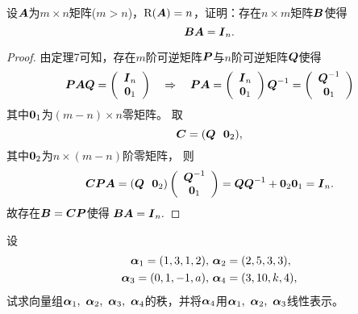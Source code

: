 \begin{frame}
\begin{li}
  设$\A$为$m\times n$矩阵($m>n$)，$\rank(\A)=n$，证明：存在$n\times m$矩阵$\B$使得
  $$
  \B\A=\II_n.
  $$
\end{li}\pause 
\begin{proof}
由定理7可知，存在$m$阶可逆矩阵$\PP$与$n$阶可逆矩阵$\QQ$使得
$$
\PP\A\QQ=\left(
  \begin{array}{c}
    \II_n\\
    \zero_1
  \end{array}
\right)     
~~~\Rightarrow~~~
\PP\A=\left(
  \begin{array}{c}
    \II_n\\
    \zero_1
  \end{array}
\right)\QQ^{-1}=\left(
  \begin{array}{c}
    \QQ^{-1}\\
    \zero_1
  \end{array}
\right)
$$
其中$\zero_1$为$(m-n)\times n$零矩阵。
取
$$
\C=(\QQ~~\zero_2),
$$
其中$\zero_2$为$n\times(m-n)$阶零矩阵， 则
$$
\C\PP\A=(\QQ~~\zero_2)\left(
  \begin{array}{c}
    \QQ^{-1}\\
    \zero_1
  \end{array}
\right)=\QQ\QQ^{-1}+\zero_2\zero_1=\II_n.
$$ 
故存在$\B=\C\PP$使得
$
\B\A=\II_n.
$
\end{proof}
\end{frame}

\begin{frame}
\begin{li}
  设
  $$
  \begin{aligned}
    \alphabd_1=(1,3,1,2), &~\alphabd_2=(2,5,3,3), \\
    \alphabd_3=(0,1,-1,a),& ~\alphabd_4=(3,10,k,4),
  \end{aligned}
  $$
  试求向量组$\alphabd_1,~\alphabd_2,~\alphabd_3,~\alphabd_4$的秩，并将$\alphabd_4$用$\alphabd_1,~\alphabd_2,~\alphabd_3$线性表示。
\end{li}
\end{frame}

